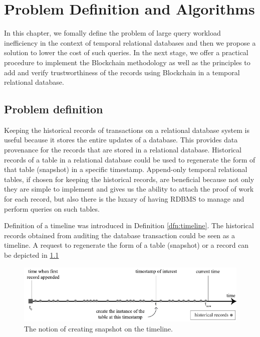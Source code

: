 \chapter{Problem Definition and Algorithms} \label{ch:algorithms}
	In this chapter, we fomally define the problem of large query workload inefficiency in the context of temporal relational databases and then we propose a solution to lower the cost of such queries. In the next stage, we offer a practical procedure to implement the Blockchain methodology as well as the principles to add and verify trustworthiness of the records using Blockchain in a temporal relational database.

	\section{Problem definition} \label{sec:problem_def}
		Keeping the historical records of transactions on a relational database system is useful because it stores the entire updates of a database. This  provides data provenance for the records that are stored in a relational database. Historical records of a table in a relational database could be used to regenerate the form of that table (snapshot) in a specific timestamp. Append-only temporal relational tables, if chosen for keeping the historical records, are beneficial because not only they are simple to implement and gives us the ability to attach the proof of work for each record, but also there is the luxary of having RDBMS to manage and perform queries on such tables.

		\begin{example}
			Definition of a timeline was introduced in Definition \ref{dfn:timeline}. The historical records obtained from auditing the database transaction could be seen as a timeline. A request to regenerate the form of a table (snapshot) or a record can be depicted in \ref{fig:snapshot_notion}
		\label{example:timeline}
		\end{example}

		\begin{figure}
			\centering
			\includegraphics[width=\textwidth]{figs/snapshot_notion.pdf}
			\caption{The notion of creating snapshot on the timeline.}
			\label{fig:snapshot_notion}
		\end{figure}


